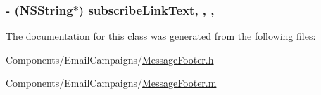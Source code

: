 \hypertarget{interface_message_footer_a58b5723e3312f652174f4cf8d8c32d4b}{
\subsubsection[{subscribe\-Link\-Text}]{\setlength{\rightskip}{0pt plus 5cm}-\/ (N\-S\-String$\ast$) subscribe\-Link\-Text\hspace{0.3cm}{\ttfamily [read]}, {\ttfamily [write]}, {\ttfamily [nonatomic]}, {\ttfamily [strong]}}}\label{interface_message_footer_a58b5723e3312f652174f4cf8d8c32d4b}


The documentation for this class was generated from the following files\-:\begin{DoxyCompactItemize}
\item 
Components/\-Email\-Campaigns/\hyperlink{_message_footer_8h}{Message\-Footer.\-h}\item 
Components/\-Email\-Campaigns/\hyperlink{_message_footer_8m}{Message\-Footer.\-m}\end{DoxyCompactItemize}
